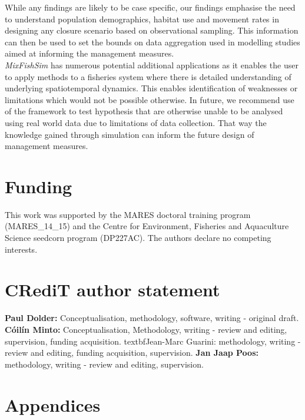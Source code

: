 \documentclass[review]{elsarticle}
\begin{document}
While any findings are likely to be case specific, our findings emphasise the
need to understand population demographics, habitat use and movement rates in
designing any closure scenario based on observational sampling. This
information can then be used to set the bounds on data aggregation used in
modelling studies aimed at informing the management measures. \\ 

\textit{MixFishSim} has numerous potential additional applications as it
enables the user to apply methods to a fisheries system where there is detailed
understanding of underlying spatiotemporal dynamics. This enables
identification of weaknesses or limitations which would not be possible
otherwise. In future, we recommend use of the framework to test hypothesis that
are otherwise unable to be analysed using real world data due to limitations of
data collection. That way the knowledge gained through simulation can inform
the future design of management measures. 

\section*{Funding} This work was supported by the MARES doctoral training
program (MARES\_14\_15) and the Centre for Environment, Fisheries and
Aquaculture Science seedcorn program (DP227AC). The authors declare no
competing interests.

\section*{CRediT author statement} \textbf{Paul Dolder:} Conceptualisation,
methodology, software, writing - original draft. \textbf{Cóilín Minto:}
Conceptualisation, Methodology, writing - review and editing, supervision,
funding acquisition. textbf{Jean-Marc Guarini:} methodology, writing - review
and editing, funding acquisition, supervision. \textbf{Jan Jaap Poos:}
methodology, writing - review and editing, supervision. \

\section*{Appendices}



\clearpage


\clearpage



\end{document}

